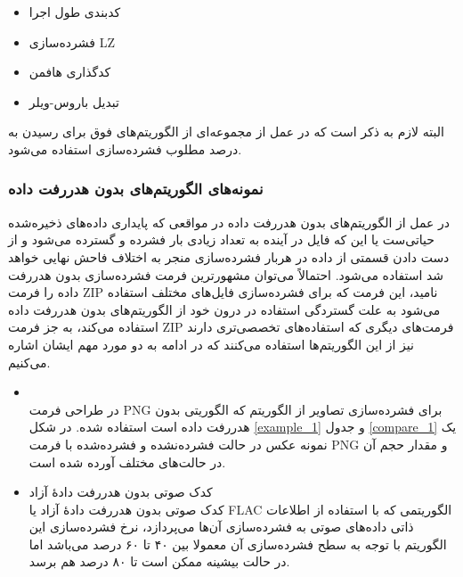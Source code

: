 \begin{itemize}
	\item کدبندی طول اجرا
	\item فشرده‌سازی LZ
	\item کدگذاری هافمن
	\item تبدیل باروس-ویلر
\end{itemize}

البته لازم به ذکر است که در عمل از مجموعه‌ای از الگوریتم‌های فوق برای رسیدن به درصد مطلوب فشرده‌سازی استفاده می‌شود.

\subsubsection{نمونه‌های الگوریتم‌های بدون هدررفت داده}
در عمل از الگوریتم‌های بدون هدررفت داده در مواقعی که 
پایداری داده‌های ذخیره‌شده حیاتی‌ست یا این که فایل در آینده به تعداد زیادی بار فشرده و گسترده می‌شود و از دست دادن قسمتی از داده در
هربار فشرده‌سازی منجر به اختلاف فاحش نهایی خواهد شد استفاده می‌شود. احتمالاً می‌توان مشهورترین فرمت فشرده‌سازی بدون هدررفت داده را
فرمت 
ZIP
نامید، این فرمت که برای فشرده‌سازی فایل‌های مختلف استفاده می‌شود به علت گستردگی استفاده در درون خود از 
الگوریتم‌های بدون هدررفت داده استفاده می‌کند، به جز فرمت ZIP 
فرمت‌های دیگری که استفاده‌های تخصصی‌تری دارند نیز از این الگوریتم‌ها استفاده می‌کنند که در ادامه به دو مورد مهم ایشان اشاره می‌کنیم.

\begin{itemize}
	\item {}\\
	در طراحی فرمت PNG برای فشرده‌سازی تصاویر از الگوریتم
	که الگوریتی بدون هدررفت داده است استفاده شده. 
	در 
	شکل 	\ref{example_1} و 
	جدول 	\ref{compare_1} 
	یک نمونه عکس در حالت فشرده‌نشده و فشرده‌شده با فرمت PNG
	و مقدار حجم آن در حالت‌های مختلف آورده شده است.

	\item کدک صوتی بدون هدررفت دادهٔ آزاد \cite{flac}\\
	کدک صوتی بدون هدررفت دادهٔ آزاد  یا FLAC
	الگوریتمی که با استفاده از اطلاعات ذاتی داده‌های صوتی به فشرده‌سازی آن‌ها می‌پردازد، نرخ فشرده‌سازی این الگوریتم با توجه به 
	سطح فشرده‌سازی آن معمولا بین ۴۰ تا ۶۰ درصد می‌باشد اما در حالت بیشینه ممکن است تا ۸۰ درصد هم برسد.
	
\end{itemize}

